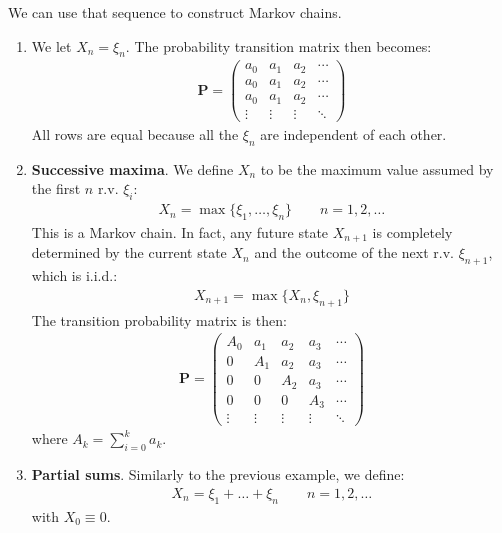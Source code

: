 \documentclass[../template.tex]{subfiles}
\begin{document}
\medskip

We can use that sequence to construct Markov chains.
\begin{enumerate}
    \item We let $X_n = \xi_n$. The probability transition matrix then becomes:
    \begin{align*}
        \textbf{P} = \left(\begin{array}{cccc}
        a_0 & a_1 & a_2 & \cdots \\ 
        a_0 & a_1 & a_2 & \cdots \\ 
        a_0 & a_1 & a_2 & \cdots \\ 
        \vdots & \vdots & \vdots & \ddots
        \end{array}\right) 
    \end{align*}
    All rows are equal because all the $\xi_n$ are independent of each other. 
    \item \textbf{Successive maxima}.  We define $X_n$ to be the maximum value assumed by the first $n$ r.v. $\xi_i$:
    \begin{align*}
        X_n = \max\{\xi_1, \dots, \xi_n\} \qquad n=1,2,\dots
    \end{align*}
    This is a Markov chain. In fact, any future state $X_{n+1}$ is completely determined by the current state $X_n$ and the outcome of the next r.v. $\xi_{n+1}$, which is i.i.d.:
    \begin{align*}
        X_{n+1} = \max\{X_n, \xi_{n+1}\}
    \end{align*}
    The transition probability matrix is then:
    \begin{align*}
        \textbf{P} = \left(\begin{array}{ccccc}
        A_0 & a_1 & a_2 & a_3 & \cdots \\ 
        0 & A_1 & a_2 & a_3 & \cdots \\ 
        0 & 0 & A_2 & a_3 & \cdots \\ 
        0 & 0 & 0 & A_3 & \cdots \\ 
        \vdots & \vdots & \vdots & \vdots & \ddots
        \end{array}\right) 
    \end{align*}
    where $A_k = \sum_{i=0}^k a_k$. %
    \item \textbf{Partial sums}. Similarly to the previous example, we define:
    \begin{align*}
        X_n = \xi_1 + \dots + \xi_n \qquad n=1,2,\dots
    \end{align*} 
    with $X_0 \equiv 0$. %
\end{enumerate}
\end{document}
